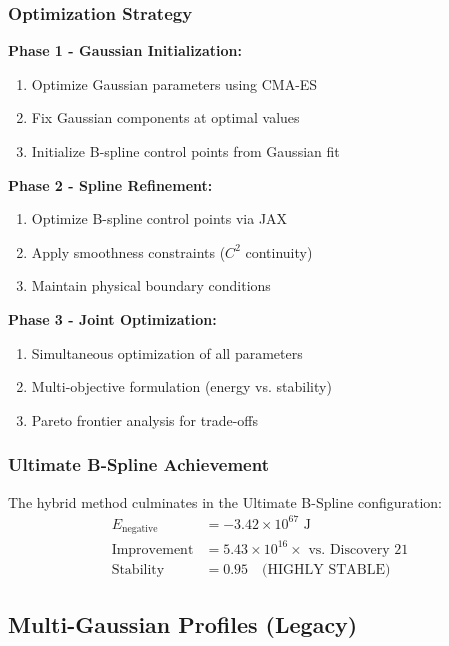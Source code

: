 \documentclass[12pt]{article}
\begin{document}
\subsubsection{Optimization Strategy}

\textbf{Phase 1 - Gaussian Initialization:}
\begin{enumerate}
\item Optimize Gaussian parameters using CMA-ES
\item Fix Gaussian components at optimal values
\item Initialize B-spline control points from Gaussian fit
\end{enumerate}

\textbf{Phase 2 - Spline Refinement:}
\begin{enumerate}
\item Optimize B-spline control points via JAX
\item Apply smoothness constraints ($C^2$ continuity)
\item Maintain physical boundary conditions
\end{enumerate}

\textbf{Phase 3 - Joint Optimization:}
\begin{enumerate}
\item Simultaneous optimization of all parameters
\item Multi-objective formulation (energy vs. stability)
\item Pareto frontier analysis for trade-offs
\end{enumerate}

\subsubsection{Ultimate B-Spline Achievement}

The hybrid method culminates in the Ultimate B-Spline configuration:
\begin{align}
E_{\text{negative}} &= -3.42 \times 10^{67} \text{ J} \\
\text{Improvement} &= 5.43 \times 10^{16}\times \text{ vs. Discovery 21} \\
\text{Stability} &= 0.95 \quad \text{(HIGHLY STABLE)}
\end{align}

\subsection{Multi-Gaussian Profiles (Legacy)}
\end{document}
